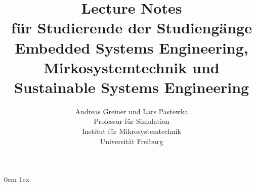 %
\newcommand\Comment[1]{\ifthenelse{\boolean{showComments}}{\leavevmode\newline{\blue #1}\newline}{}}
%
\newcommand\Erratum[1]{\ifthenelse{\boolean{showErratum}}{\leavevmode\newline{\red #1}\newline}{}} 
%
\title{\huge Lecture Notes\\
\large für Studierende der Studiengänge Embedded Systems Engineering, Mirkosystemtechnik und Sustainable Systems Engineering}
\author{Andreas Greiner und Lars Pastewka \\Professur für Simulation\\Institut für Mikrosystemtechnik\\Universität Freiburg}
\parindent0em
\parskip1ex
\pagestyle{headings}
\setcounter{secnumdepth}{3}
%